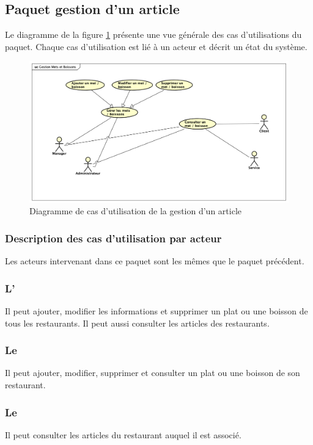 \subsection{Paquet gestion d'un article}
Le diagramme de la figure \ref{fig.12} présente une vue générale des cas d'utilisations du paquet. Chaque cas d'utilisation est lié à un acteur et décrit un état du système.
\begin{figure}[H]
	\centering
	\includegraphics[scale=0.4]{assets/images/gestion_items_uc.png}
	\caption{Diagramme de cas d'utilisation de la gestion d'un article}
	\label{fig.12}
\end{figure}
\subsubsection{Description des cas d'utilisation par acteur}
Les acteurs intervenant dans ce paquet sont les mêmes que le paquet précédent.
\subsubsection*{L'\adm}
Il peut ajouter, modifier les informations et supprimer un plat ou une boisson de tous les restaurants. Il peut aussi consulter les articles des restaurants.

\subsubsection*{Le \m}
Il peut ajouter, modifier, supprimer et consulter un plat ou une boisson de son restaurant.

\subsubsection*{Le \sev}
Il peut consulter les articles du restaurant auquel il est associé.

